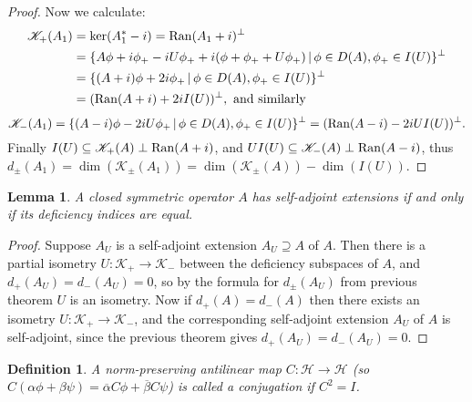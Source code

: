 \documentclass[12pt,oneside]{report}
\newtheorem{lem}[thm]{Lemma}
\newtheorem{defn}[thm]{Definition}
\begin{document}
\begin{proof}
    Now we calculate: \begin{align*}
        \mathscr{K}_{+}(A_{1}) &= \ker(A_{1}^{*} - i)  = \mathrm{Ran}(A_{1} + i)^{\perp}  \\
        &= \{ A\phi + i\phi_{+} - iU\phi_{+} + i(\phi + \phi_{+} + U\phi_{+}) \, | \, \phi \in D(A), \phi_{+} \in I(U) \}^{\perp}  \\
        &= \{ (A + i)\phi + 2i\phi_{+} \, | \, \phi \in D(A), \phi_{+} \in I(U) \}^{\perp} \\
        &= (\mathrm{Ran}(A+i) + 2iI(U))^{\perp}, \text{ and similarly}
    \end{align*}
    $$\mathscr{K}_{-}(A_{1}) = \{ (A - i)\phi - 2iU\phi_{+} \, | \, \phi \in D(A), \phi_{+} \in I(U) \}^{\perp} = (\mathrm{Ran}(A - i) - 2iUI(U))^\perp.$$
    Finally $I(U) \subseteq \mathscr{K}_{+}(A) \perp \mathrm{Ran}(A+i)$, and $UI(U) \subseteq \mathscr{K}_{-}(A) \perp \mathrm{Ran}(A - i)$, thus $d_{\pm}(A_{1}) = \dim(\mathscr{K}_{\pm}(A_{1})) = \dim(\mathscr{K}_{\pm}(A)) - \dim(I(U))$.
\end{proof}

\begin{lem}
    A closed symmetric operator $A$ has self-adjoint extensions if and only if its deficiency indices are equal.
\end{lem}
\begin{proof}
    Suppose $A_{U}$ is a self-adjoint extension $A_{U} \supseteq A$ of $A$. Then there is a partial isometry $U: \mathscr{K}_{+} \to \mathscr{K}_{-}$ between the deficiency subspaces of $A$, and $d_{+}(A_{U}) = d_{-}(A_{U}) = 0$, so by the formula for $d_{\pm}(A_{U})$ from previous theorem $U$ is an isometry. Now if $d_{+}(A) = d_{-}(A)$ then there exists an isometry $U: \mathscr{K}_{+} \to \mathscr{K}_{-}$, and the corresponding self-adjoint extension $A_{U}$ of $A$ is self-adjoint, since the previous theorem gives $d_{+}(A_{U}) = d_{-}(A_{U}) = 0$.
\end{proof}

\begin{defn}
    A norm-preserving antilinear map $C: \mathscr{H} \to \mathscr{H}$ (so $C(\alpha \phi + \beta \psi) = \overline{\alpha}C\phi + \overline{\beta}C\psi$) is called a conjugation if $C^{2} = I$.
\end{defn}
\end{document}
